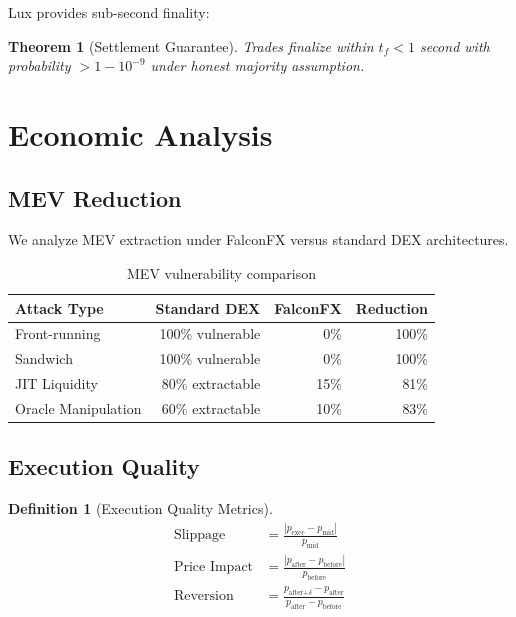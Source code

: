 \documentclass[11pt,a4paper]{article}
\newtheorem{definition}{Definition}
\newtheorem{theorem}{Theorem}
\begin{document}
Lux provides sub-second finality:

\begin{theorem}[Settlement Guarantee]
Trades finalize within $t_f < 1$ second with probability $> 1 - 10^{-9}$ under honest majority assumption.
\end{theorem}

\section{Economic Analysis}

\subsection{MEV Reduction}

We analyze MEV extraction under FalconFX versus standard DEX architectures.

\begin{table}[h]
\centering
\begin{tabular}{lrrr}
\toprule
\textbf{Attack Type} & \textbf{Standard DEX} & \textbf{FalconFX} & \textbf{Reduction} \\
\midrule
Front-running & 100\% vulnerable & 0\% & 100\% \\
Sandwich & 100\% vulnerable & 0\% & 100\% \\
JIT Liquidity & 80\% extractable & 15\% & 81\% \\
Oracle Manipulation & 60\% extractable & 10\% & 83\% \\
\bottomrule
\end{tabular}
\caption{MEV vulnerability comparison}
\end{table}

\subsection{Execution Quality}

\begin{definition}[Execution Quality Metrics]
\begin{align}
    \text{Slippage} &= \frac{|p_{\text{exec}} - p_{\text{mid}}|}{p_{\text{mid}}} \\
    \text{Price Impact} &= \frac{|p_{\text{after}} - p_{\text{before}}|}{p_{\text{before}}} \\
    \text{Reversion} &= \frac{p_{\text{after+}\delta} - p_{\text{after}}}{p_{\text{after}} - p_{\text{before}}}
\end{align}
\end{definition}
\end{document}

